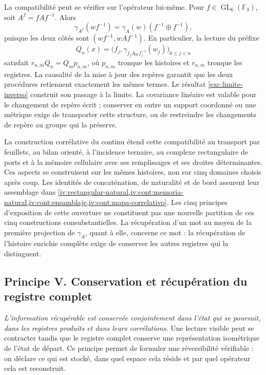 La compatibilité peut se vérifier sur l'opérateur lui-même. Pour \(f\in\operatorname{GL}_6(\mathbb F_3)\), soit \(A^f=fAf^{-1}\). Alors
\[
 \gamma_{A^f}(wf^{-1})
      =\gamma_A(w)(f^{-1}\oplus f^{-1}),
\]
puisque les deux côtés sont \((wf^{-1},wAf^{-1})\). En particulier, la lecture du préfixe
\[
 Q_n(x)=\bigl(f_j,
       \gamma_{f_jA_Wf_j^{-1}}(w_j)\bigr)_{0\leq j<n}
\]
satisfait \(r_{n,m}Q_n=Q_m p_{n,m}\), où \(p_{n,m}\) tronque les histoires et \(r_{n,m}\) tronque les registres. La causalité de la mise à jour des repères garantit que les deux procédures retiennent exactement les mêmes termes. Le résultat \cref{exc:limite-inverso} construit son passage à la limite. La covariance linéaire est valable pour le changement de repère écrit ; conserver en outre un support coordonné ou une métrique exige de transporter cette structure, ou de restreindre les changements de repère au groupe qui la préserve.

La construction corrélative du continu étend cette compatibilité au
transport par feuillets, au bilan orienté, à l’incidence ternaire, au
complexe rectangulaire de ports et à la mémoire cellulaire avec ses remplissages et
ses droites déterminantes. Ces aspects se construisent sur les mêmes
histoires, non sur cinq domaines choisis après coup. Les identités de
concaténation, de naturalité et de bord assurent leur assemblage dans
\cref{iv:rectangular-natural,iv:cont:memoria-natural,iv:cont:ensamblaje,iv:cont:mapa-correlativo}.
Les cinq principes d’exposition de cette ouverture ne constituent pas une nouvelle
partition de ces cinq constructions consubstantielles. La récupération
d’un mot au moyen de la première projection de \(\gamma_A\), quant à elle,
concerne ce mot : la récupération de l’histoire enrichie
complète exige de conserver les autres registres qui la distinguent.


\subsection*{Principe V. Conservation et récupération du registre complet}
\hypertarget{prinh:conservacion}{}

\emph{L’information récupérable est conservée conjointement dans l’état
qui se poursuit, dans les registres produits et dans leurs corrélations.} Une
lecture visible peut se contracter tandis que le registre complet conserve une
représentation isométrique de l’état de départ. Ce principe permet de
formuler une réversibilité vérifiable : on déclare ce qui est stocké, dans quel
espace cela réside et par quel opérateur cela est reconstruit.

